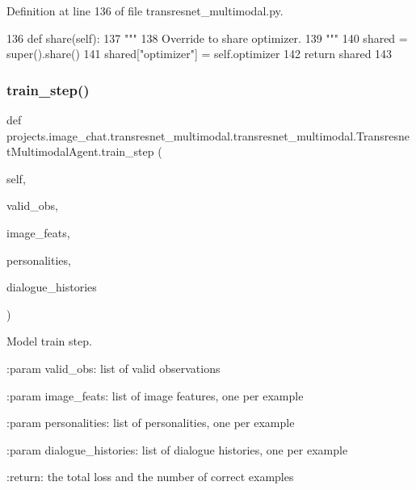 Definition at line 136 of file transresnet\+\_\+multimodal.\+py.


\begin{DoxyCode}
136     \textcolor{keyword}{def }share(self):
137         \textcolor{stringliteral}{"""}
138 \textcolor{stringliteral}{        Override to share optimizer.}
139 \textcolor{stringliteral}{        """}
140         shared = super().share()
141         shared[\textcolor{stringliteral}{"optimizer"}] = self.optimizer
142         \textcolor{keywordflow}{return} shared
143 
\end{DoxyCode}
\mbox{\label{classprojects_1_1image__chat_1_1transresnet__multimodal_1_1transresnet__multimodal_1_1TransresnetMultimodalAgent_a5836026083146df8a7b4ed354ecf1070}} 
\subsubsection{\texorpdfstring{train\+\_\+step()}{train\_step()}}
{\footnotesize\ttfamily def projects.\+image\+\_\+chat.\+transresnet\+\_\+multimodal.\+transresnet\+\_\+multimodal.\+Transresnet\+Multimodal\+Agent.\+train\+\_\+step (\begin{DoxyParamCaption}\item[{}]{self,  }\item[{}]{valid\+\_\+obs,  }\item[{}]{image\+\_\+feats,  }\item[{}]{personalities,  }\item[{}]{dialogue\+\_\+histories }\end{DoxyParamCaption})}

\begin{DoxyVerb}Model train step.

:param valid_obs:
    list of valid observations

:param image_feats:
    list of image features, one per example

:param personalities:
    list of personalities, one per example

:param dialogue_histories:
    list of dialogue histories, one per example

:return:
    the total loss and the number of correct examples
\end{DoxyVerb}
 

